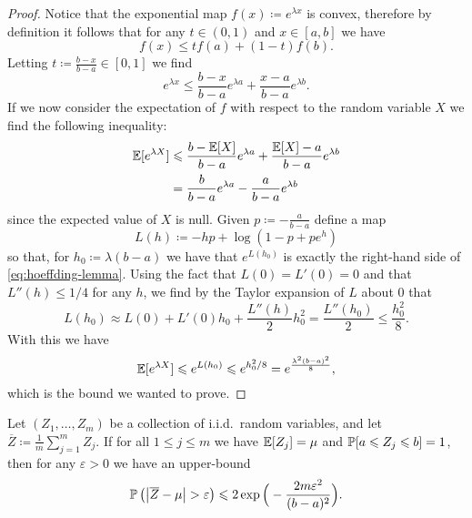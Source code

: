 \begin{proof}
    Notice that the exponential map \(f(x) \coloneq e^{\lambda x}\) is convex,
    therefore by definition it follows that for any \(t \in (0, 1)\) and \(x \in [a,
        b]\) we have
    \[
        f(x) \leq t f(a) + (1 - t) f(b).
    \]
    Letting \(t \coloneq \frac{b - x}{b - a} \in [0, 1]\) we find
    \[
        e^{\lambda x} \leq \frac{b-x}{b-a} e^{\lambda a} + \frac{x-a}{b-a} e^{\lambda b}.
    \]
    If we now consider the expectation of \(f\) with respect to the random variable
    \(X\) we find the following inequality:
    \begin{align}\label{eq:hoeffding-lemma}
        \nonumber
        \operatorname{\mathbb{E}}[e^{\lambda X}]
         & \leqslant \frac{b - \operatorname{\mathbb{E}}[X]}{b - a} e^{\lambda a}
        + \frac{\operatorname{\mathbb{E}}[X] - a}{b - a} e^{\lambda b}                       \\
         & = \frac{b}{b - a} e^{\lambda a} - \frac{a}{b - a} e^{\lambda b}
    \end{align}
    since the expected value of \(X\) is null. Given \(p \coloneq -\frac{a}{b - a}\)
    define a map
    \[
        L(h) \coloneq -h p + \log(1 - p + p e^h)
    \]
    so that, for \(h_0 \coloneq \lambda(b - a)\) we have that \(e^{L(h_0)}\) is
    exactly the right-hand side of \cref{eq:hoeffding-lemma}. Using the fact that
    \(L(0) = L'(0) = 0\) and that \(L''(h) \leq 1/4\) for any \(h\), we find by the
    Taylor expansion of \(L\) about \(0\) that
    \[
        L(h_0) \approx L(0) + L'(0) h_0 + \frac{L''(h)}{2} h_0^2 = \frac{L''(h_0)}{2}
        \leq \frac{h_0^2}{8}.
    \]
    With this we have
    \[
        \operatorname{\mathbb{E}}[e^{\lambda X}] \leqslant e^{L(h_0)} \leqslant e^{h_0^2/8}
        = e^{\frac{\lambda^2 (b - a)^2}{8}},
    \]
    which is the bound we wanted to prove.
\end{proof}

\begin{lemma}
    \label{lem:hoeffding-inequality}
    Let \((Z_1, \dots, Z_m)\) be a collection of i.i.d.~random variables,
    and let \(\overline Z \coloneq \frac{1}{m} \sum_{j=1}^m Z_j\).  If for
    all \(1 \leq j \leq m\) we have \(\operatorname{\mathbb{E}}[Z_j] = \mu\) and
    \(\operatorname{\mathbb{P}}[a \leqslant Z_j \leqslant b] = 1\), then for any \(\varepsilon > 0\) we have
    an upper-bound
    \[
        \operatorname{\mathbb{P}}\big( \big| \overline{Z} - \mu \big| > \varepsilon \big)
        \leqslant 2 \exp\Big( -\frac{2 m \varepsilon^{2}}{(b - a)^2} \Big).
    \]
\end{lemma}

